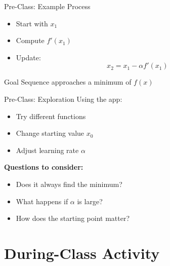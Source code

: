 \documentclass[dvipsnames]{beamer}
\begin{document}
\begin{frame}{Pre-Class: Example Process}
\begin{itemize}
    \item Start with $x_1$
    \item Compute $f'(x_1)$
    \item Update:
    \[
    x_2 = x_1 - \alpha f'(x_1)
    \]
\end{itemize}



\begin{block}{Goal}
Sequence approaches a minimum of $f(x)$
\end{block}

\end{frame}


\begin{frame}{Pre-Class: Exploration}
Using the app:
\begin{itemize}
    \item Try different functions
    \item Change starting value $x_0$
    \item Adjust learning rate $\alpha$
\end{itemize}



\textbf{Questions to consider:}
\begin{itemize}
    \item Does it always find the minimum?
    \item What happens if $\alpha$ is large?
    \item How does the starting point matter?
\end{itemize}

\end{frame}

\section{During-Class Activity}
\end{document}
